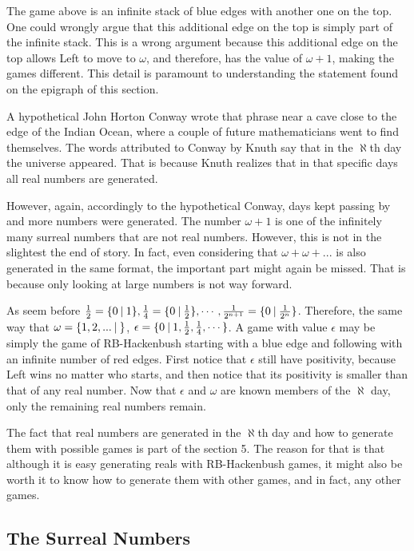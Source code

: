 The game above is an infinite stack of blue edges with another one on the top. One could wrongly argue that this additional edge on the top is simply part of the infinite stack. This is a wrong argument because this additional edge on the top allows Left to move to $\omega$, and therefore, has the value of $\omega+1$, making the games different. This detail is paramount to understanding the statement found on the epigraph of this section.

A hypothetical John Horton Conway wrote that phrase near a cave close to the edge of the Indian Ocean, where a couple of future mathematicians went to find themselves. The words attributed to Conway by Knuth say that in the $\aleph$th day the universe appeared. That is because Knuth realizes that in that specific days all real numbers are generated.

However, again, accordingly to the hypothetical Conway, days kept passing by and more numbers were generated. The number $\omega+1$ is one of the infinitely many surreal numbers that are not real numbers. However, this is not in the slightest the end of story. In fact, even considering that $\omega + \omega + ...$  is also generated in the same format, the important part might again be missed. That is because only looking at large numbers is not way forward.

As seem before $\frac{1}{2} = \mbox{$\{0\:|\:1\}$}, \frac{1}{4} = \mbox{$\{0\:|\:\frac{1}{2}\}$}, \cdots, \frac{1}{2^{n+1}} = \mbox{$\{0\:|\:\frac{1}{2^n}\}$}$. Therefore, the same way that $\omega=\mbox{$\{1,2,...\:|\:\}$}$, $\epsilon=\mbox{$\{0\:|\:1,\frac{1}{2},\frac{1}{4},\cdots\}$}$. A game with value $\epsilon$ may be simply the game of RB-Hackenbush starting with a blue edge and following with an infinite number of red edges. First notice that $\epsilon$ still have positivity, because Left wins no matter who starts, and then notice that its positivity is smaller than that of any real number. Now that $\epsilon$ and $\omega$ are known members of the $\aleph$ day, only the remaining real numbers remain.

The fact that real numbers are generated in the $\aleph$th day and how to generate them with possible games is part of the section 5. The reason for that is that although it is easy generating reals with RB-Hackenbush games, it might also be worth it to know how to generate them with other games, and in fact, any other games.

\subsection*{The Surreal Numbers}

